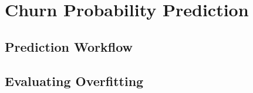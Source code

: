 \section{Churn Probability Prediction}
\label{ref:prediction}

\subsection{Prediction Workflow}

\subsection{Evaluating Overfitting}